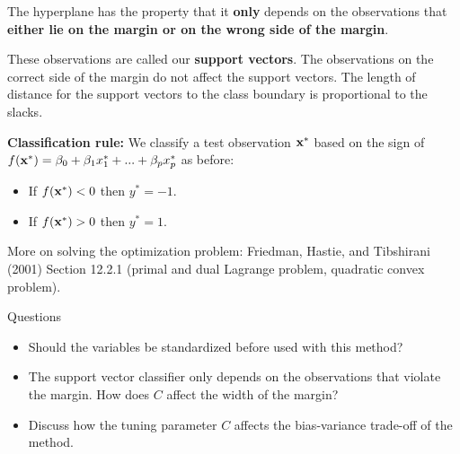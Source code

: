 \documentclass[ignorenonframetext,]{beamer}
\providecommand{\tightlist}{%
  \setlength{\itemsep}{0pt}\setlength{\parskip}{0pt}}
\begin{document}
\begin{frame}

The hyperplane has the property that it \textbf{only} depends on the
observations that \textbf{either lie on the margin or on the wrong side
of the margin}.

These observations are called our \textbf{support vectors}. The
observations on the correct side of the margin do not affect the support
vectors. The length of distance for the support vectors to the class
boundary is proportional to the slacks.

\end{frame}

\begin{frame}

\textbf{Classification rule:} We classify a test observation
\({\bf x}^*\) based on the sign of
\(f({\bf x}^*)=\beta_0+\beta_1 x_1^*+...+\beta_p x_p^*\) as before:

\begin{itemize}
\tightlist
\item
  If \(f({\bf x}^*)<0\) then \(y^*=-1\).
\item
  If \(f({\bf x}^*)>0\) then \(y^*=1\).
\end{itemize}

More on solving the optimization problem: Friedman, Hastie, and
Tibshirani (2001) Section 12.2.1 (primal and dual Lagrange problem,
quadratic convex problem).

\end{frame}

\begin{frame}

\begin{block}{Questions}

\begin{itemize}
\tightlist
\item
  Should the variables be standardized before used with this method?
\item
  The support vector classifier only depends on the observations that
  violate the margin. How does \(C\) affect the width of the margin?\\
\item
  Discuss how the tuning parameter \(C\) affects the bias-variance
  trade-off of the method.
\end{itemize}

\end{block}

\end{frame}
\end{document}
